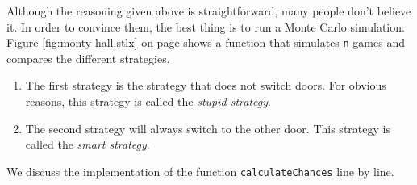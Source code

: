 Although the reasoning given above is straightforward, many people don't believe it.  In order to
convince them, the best thing is to run a Monte Carlo simulation.  Figure \ref{fig:monty-hall.stlx}
on page 
\pageref{fig:monty-hall.stlx} shows a function that simulates \texttt{n} games and compares the
different strategies.  
\begin{enumerate}
\item The first strategy is the strategy that does not switch doors.
      For obvious reasons, this strategy is called the \emph{stupid strategy}.
\item The second strategy will always switch to the other door.
      This strategy is called the \emph{smart strategy}.
\end{enumerate}
We discuss the implementation of the function \texttt{calculateChances} line by line.
